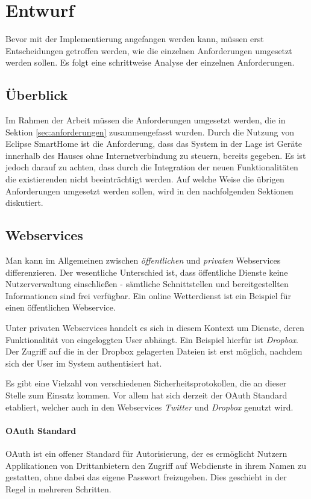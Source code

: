 \chapter{Entwurf}
\label{chap:entwurf}
Bevor mit der Implementierung angefangen werden kann, müssen erst Entscheidungen
getroffen werden, wie die einzelnen Anforderungen umgesetzt werden sollen. Es folgt eine
schrittweise Analyse der einzelnen Anforderungen.

\section{Überblick}
Im Rahmen der Arbeit müssen die Anforderungen umgesetzt werden, die in Sektion \ref{sec:anforderungen} zusammengefasst wurden. Durch die Nutzung von Eclipse SmartHome ist die Anforderung, dass das System in der Lage ist Geräte innerhalb des Hauses ohne Internetverbindung zu steuern, bereits gegeben. Es ist jedoch darauf zu achten, dass durch die Integration der neuen Funktionalitäten die existierenden nicht beeinträchtigt werden.
Auf welche Weise die übrigen Anforderungen umgesetzt werden sollen, wird in den nachfolgenden Sektionen diskutiert.


\section{Webservices}
Man kann im Allgemeinen zwischen \textit{öffentlichen} und \textit{privaten} Webservices differenzieren. Der wesentliche Unterschied ist, dass öffentliche Dienste keine Nutzerverwaltung einschließen - sämtliche Schnittstellen und bereitgestellten Informationen sind frei verfügbar. Ein online Wetterdienst ist ein Beispiel für einen öffentlichen Webservice. 

Unter privaten Webservices handelt es sich in diesem Kontext um Dienste, deren Funktionalität von eingeloggten User abhängt. Ein Beispiel hierfür ist \textit{Dropbox}. Der Zugriff auf die in der Dropbox gelagerten Dateien ist erst möglich, nachdem sich der User im System authentisiert hat. 

Es gibt eine Vielzahl von verschiedenen Sicherheitsprotokollen, die an dieser Stelle zum Einsatz kommen. Vor allem hat sich derzeit der OAuth Standard etabliert, welcher auch in den Webservices \textit{Twitter} und \textit{Dropbox} genutzt wird.\\

\subsubsection{OAuth Standard}
\label{subsubsec:oauth}
OAuth\cite{oauth} ist ein offener Standard für Autorisierung, der es ermöglicht Nutzern Applikationen von Drittanbietern den Zugriff auf Webdienste in ihrem Namen zu gestatten, ohne dabei das eigene Passwort freizugeben. Dies geschieht in der Regel in mehreren Schritten.


